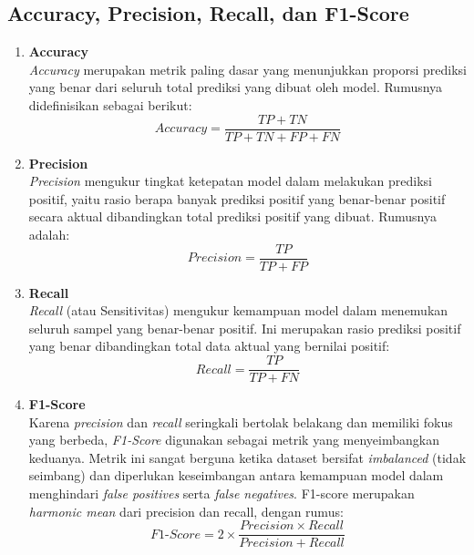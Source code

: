\subsection{Accuracy, Precision, Recall, dan F1-Score}
\begin{enumerate}
    \item \textbf{Accuracy}\\
    \textit{Accuracy} merupakan metrik paling dasar yang menunjukkan proporsi prediksi yang benar dari seluruh total prediksi yang dibuat oleh model. Rumusnya didefinisikan sebagai berikut:
    \begin{equation}
        Accuracy = \frac{TP + TN}{TP + TN + FP + FN}
    \end{equation}

    \item \textbf{Precision}\\
    \textit{Precision} mengukur tingkat ketepatan model dalam melakukan prediksi positif, yaitu rasio berapa banyak prediksi positif yang benar-benar positif secara aktual dibandingkan total prediksi positif yang dibuat. Rumusnya adalah:
    \begin{equation}
        Precision = \frac{TP}{TP + FP}
    \end{equation}

    \item \textbf{Recall}\\
    \textit{Recall} (atau Sensitivitas) mengukur kemampuan model dalam menemukan seluruh sampel yang benar-benar positif. Ini merupakan rasio prediksi positif yang benar dibandingkan total data aktual yang bernilai positif:
    \begin{equation}
        Recall = \frac{TP}{TP + FN}
    \end{equation}

    \item \textbf{F1-Score}\\
    Karena \textit{precision} dan \textit{recall} seringkali bertolak belakang dan memiliki fokus yang berbeda, \textit{F1-Score} digunakan sebagai metrik yang menyeimbangkan keduanya. Metrik ini sangat berguna ketika dataset bersifat \textit{imbalanced} (tidak seimbang) dan diperlukan keseimbangan antara kemampuan model dalam menghindari \textit{false positives} serta \textit{false negatives}. F1-score merupakan \textit{harmonic mean} dari precision dan recall, dengan rumus:
    \begin{equation}
        F1\text{-}Score = 2 \times \frac{Precision \times Recall}{Precision + Recall}
    \end{equation}
\end{enumerate}

